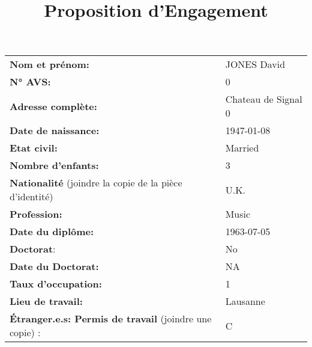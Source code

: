 \documentclass[
]{article}
\title{Proposition d'Engagement}
\author{}
\date{\vspace{-2.5em}}
\begin{document}
\maketitle

\begin{longtable}[]{@{}ll@{}}
\toprule
\endhead
\textbf{Nom et prénom:} & JONES David\tabularnewline
\textbf{N° AVS:} & 0\tabularnewline
\textbf{Adresse complète:} & Chateau de Signal 0\tabularnewline
\textbf{Date de naissance:} & 1947-01-08\tabularnewline
\textbf{Etat civil:} & Married\tabularnewline
\textbf{Nombre d'enfants:} & 3\tabularnewline
\textbf{Nationalité} (joindre la copie de la pièce d'identité) &
U.K.\tabularnewline
\textbf{Profession:} & Music\tabularnewline
\textbf{Date du diplôme:} & 1963-07-05\tabularnewline
\textbf{Doctorat}: & No\tabularnewline
\textbf{Date du Doctorat:} & NA\tabularnewline
\textbf{Taux d'occupation:} & 1\tabularnewline
\textbf{Lieu de travail:} & Lausanne\tabularnewline
\textbf{Étranger.e.s: Permis de travail} (joindre une copie) : &
C\tabularnewline
\bottomrule
\end{longtable}
\end{document}

